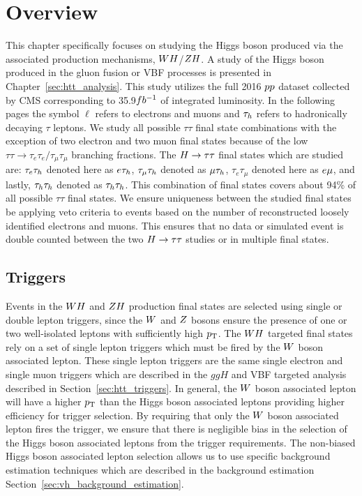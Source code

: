 \section{Overview}
This chapter specifically focuses on studying the Higgs boson produced via the associated
production mechanisms, $WH$/$ZH$. A study of the Higgs boson produced in the gluon fusion or VBF processes
is presented in Chapter~\ref{sec:htt_analysis}. This study utilizes the
full 2016 $pp$ dataset collected by CMS corresponding to 35.9$fb^{-1}$ of integrated luminosity.
In the following pages the symbol $\ell$ refers to electrons and muons and $\tau_{h}$ refers to hadronically
decaying $\tau$ leptons. We study all possible $\tau\tau$ final state combinations with the
exception of two electron and two muon final states because of the low 
$\tau\tau \to \tau_{e}\tau_{e}/\tau_{\mu}\tau_{\mu}$
branching fractions. The $H\to\tau\tau$ final states which are
studied are: $\tau_{e}\tau_{h}$ denoted here as $e\tau_{h}$, $\tau_{\mu}\tau_{h}$ denoted as $\mu\tau_{h}$,
$\tau_{e}\tau_{\mu}$ denoted here as $e\mu$, and lastly, $\tau_{h}\tau_{h}$ denoted as $\tau_{h}\tau_{h}$.
This combination of final states covers about 94\% of all possible $\tau\tau$ final states.
We ensure uniqueness between the studied final states be applying veto criteria to events based
on the number of reconstructed loosely identified electrons and muons. This ensures that 
no data or simulated event is double counted between the two $H\to\tau\tau$ studies or in 
multiple final states.



\subsection{Triggers}
Events in the $WH$ and $ZH$ production final states are selected using single or 
double lepton triggers, since the $W$ and $Z$ bosons ensure the presence of one 
or two well-isolated leptons with sufficiently high $p_\mathrm{T}$. 
The $WH$ targeted final states rely on a set of single lepton triggers
which must be fired by the $W$ boson associated lepton. These single
lepton triggers are the same single electron and single muon triggers which are 
described in the $ggH$ and VBF targeted analysis described in 
Section~\ref{sec:htt_triggers}. In general, the $W$ boson associated lepton
will have a higher $p_\mathrm{T}$ than the Higgs boson associated leptons providing
higher efficiency for trigger selection. By requiring that only the $W$
boson associated lepton fires the trigger, we ensure that there is negligible
bias in the selection of the Higgs boson associated leptons from the trigger
requirements. The non-biased Higgs boson associated lepton selection 
allows us to use specific background estimation techniques which are described
in the background estimation Section~\ref{sec:vh_background_estimation}.

